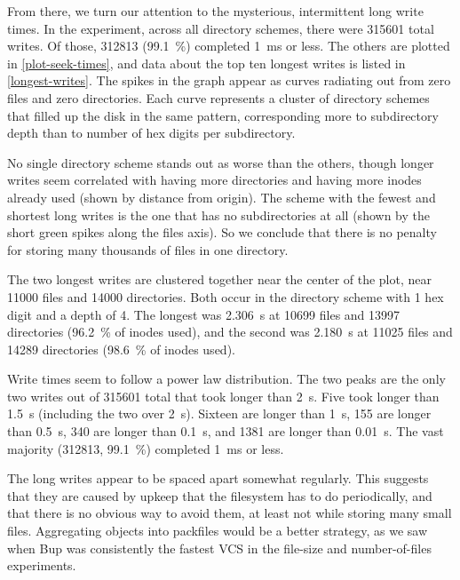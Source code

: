 From there, we turn our attention to the mysterious, intermittent long write
times. In the experiment, across all directory schemes, there were \num{315601}
total writes. Of those, \num{312813} (\SI{99.1}{\percent}) completed \SI{1}{\ms}
or less. The others are plotted in \autoref{plot-seek-times}, and data about the
top ten longest writes is listed in \autoref{longest-writes}. The spikes in the
graph appear as curves radiating out from zero files and zero directories. Each
curve represents a cluster of directory schemes that filled up the disk in the
same pattern, corresponding more to subdirectory depth than to number of hex
digits per subdirectory.

No single directory scheme stands out as worse than the others, though longer
writes seem correlated with having more directories and having more
\glspl{inode} already used (shown by distance from origin). The scheme with the
fewest and shortest long writes is the one that has no subdirectories at all
(shown by the short green spikes along the files axis). So we conclude that
there is no penalty for storing many thousands of files in one directory.

The two longest writes are clustered together near the center of the plot, near
\num{11000} files and \num{14000} directories. Both occur in the directory
scheme with \num{1} hex digit and a depth of \num{4}. The longest was
\SI{2.306}{\second} at \num{10699} files and \num{13997} directories
(\SI{96.2}{\percent} of inodes used), and the second was \SI{2.180}{\second} at
\num{11025} files and \num{14289} directories (\SI{98.6}{\percent} of inodes
used).

%

Write times seem to follow a power law distribution. The two peaks are the only
two writes out of \num{315601} total that took longer than \SI{2}{\second}. Five
took longer than \SI{1.5}{\s} (including the two over \SI{2}{\s}). Sixteen are
longer than \SI{1}{\s}, \num{155} are longer than \SI{0.5}{\s}, \num{340} are
longer than \SI{0.1}{\s}, and \num{1381} are longer than \SI{0.01}{\s}. The vast
majority (\num{312813}, \SI{99.1}{\percent}) completed \SI{1}{\ms} or less.

The long writes appear to be spaced apart somewhat regularly. This suggests that
they are caused by upkeep that the filesystem has to do periodically, and that
there is no obvious way to avoid them, at least not while storing many small
files. Aggregating objects into \glspl{packfile} would be a better strategy, as
we saw when Bup was consistently the fastest \gls{VCS} in the file-size and
number-of-files experiments.

